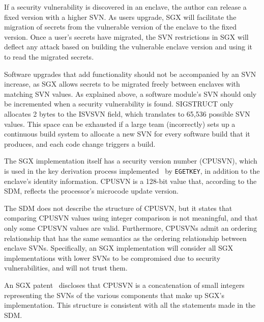 If a security vulnerability is discovered in an enclave, the author can release
a fixed version with a higher SVN. As users upgrade, SGX will facilitate the
migration of secrets from the vulnerable version of the enclave to the fixed
version. Once a user's secrets have migrated, the SVN restrictions in SGX will
deflect any attack based on building the vulnerable enclave version and using
it to read the migrated secrets.

Software upgrades that add functionality should not be accompanied by an SVN
increase, as SGX allows secrets to be migrated freely between enclaves with
matching SVN values. As explained above, a software module's SVN should only be
incremented when a security vulnerability is found. SIGSTRUCT only allocates
2 bytes to the ISVSVN field, which translates to 65,536 possible SVN values.
This space can be exhausted if a large team (incorrectly) sets up a continuous
build system to allocate a new SVN for every software build that it produces,
and each code change triggers a build.


\label{sec:sgx_cpusvn}


The SGX implementation itself has a security version number (CPUSVN), which is
used in the key derivation process implemented~\cite{intel2013patent1} by
\texttt{EGETKEY}, in addition to the enclave's identity information. CPUSVN is
a 128-bit value that, according to the SDM, reflects the processor's microcode
update version.


The SDM does not describe the structure of CPUSVN, but it states that comparing
CPUSVN values using integer comparison is not meaningful, and that only some
CPUSVN values are valid. Furthermore, CPUSVNs admit an ordering relationship
that has the same semantics as the ordering relationship between enclave SVNs.
Specifically, an SGX implementation will consider all SGX implementations with
lower SVNs to be compromised due to security vulnerabilities, and will not
trust them.


An SGX patent~\cite{intel2013patent1} discloses that CPUSVN is a concatenation
of small integers representing the SVNs of the various components that make up
SGX's implementation. This structure is consistent with all the statements made
in the SDM.


